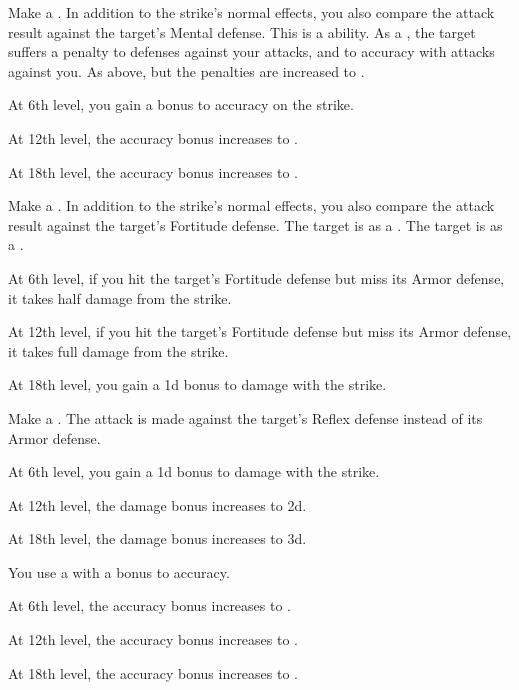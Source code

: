 {             Make a .
            In addition to the strike's normal effects, you also compare the attack result against the target's Mental defense.
            This is a  ability.
             As a , the target suffers a  penalty to defenses against your attacks, and to accuracy with attacks against you.
             As above, but the penalties are increased to .
            \par At 6th level, you gain a  bonus to accuracy on the strike.
            \par At 12th level, the accuracy bonus increases to .
            \par At 18th level, the accuracy bonus increases to .

             Make a .
            In addition to the strike's normal effects, you also compare the attack result against the target's Fortitude defense.
             The target is \sickened as a .
             The target is \nauseated as a .
            \par At 6th level, if you hit the target's Fortitude defense but miss its Armor defense, it takes half damage from the strike.
            \par At 12th level, if you hit the target's Fortitude defense but miss its Armor defense, it takes full damage from the strike.
            \par At 18th level, you gain a \plus1d bonus to damage with the strike.

             Make a .
            The attack is made against the target's Reflex defense instead of its Armor defense.
            \par At 6th level, you gain a \plus1d bonus to damage with the strike.
            \par At 12th level, the damage bonus increases to \plus2d.
            \par At 18th level, the damage bonus increases to \plus3d.

             You use a  with a  bonus to accuracy.
            \par At 6th level, the accuracy bonus increases to .
            \par At 12th level, the accuracy bonus increases to .
            \par At 18th level, the accuracy bonus increases to .

}
